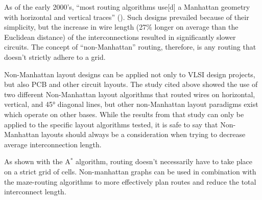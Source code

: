 
As of the early 2000's, ``most routing algorithms use[d]
a Manhattan geometry with horizontal and vertical traces''
(\cite{1360580}). Such designs prevailed because of
their simplicity, but the increase in wire length (27\%
longer on average than the Euclidean distance) of the
interconnections resulted in significantly slower circuits.
The concept of ``non-Manhattan'' routing, therefore,
is any routing that doesn't strictly adhere to a grid.

Non-Manhattan layout designs can be applied not only
to VLSI design projects, but also PCB and other circuit
layouts. The study cited above showed the use of two
different Non-Manhattan layout algorithms that routed
wires on horizontal, vertical, and \ang{45} diagonal
lines, but other non-Manhattan layout paradigms exist
which operate on other bases. While the results from
that study can only be applied to the specific layout
algorithms tested, it is safe to say that Non-Manhattan
layouts should always be a consideration when trying
to decrease average interconnection length.

As shown with the A$^*$ algorithm, routing doesn't necessarily
have to take place on a strict grid of cells. Non-manhattan
graphs can be used in combination with the maze-routing
algorithms to more effectively plan routes and reduce
the total interconnect length.


